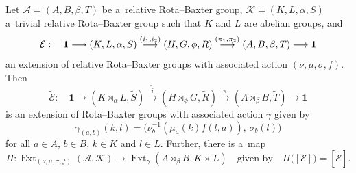\documentclass{jonasart}
\theoremstyle{plain}
\DeclareMathOperator{\Ext}{Ext}
\begin{document}
	\begin{corollary}\label{RRB2rbext}
		Let $\mathcal{A}= (A,B, \beta, T)$ be a~relative Rota--Baxter group, $\mathcal{K}= (K,L,\alpha,S )$ a~trivial relative Rota--Baxter group such that $K$ and $L$ are abelian groups, and
		\[
		\mathcal{E} : \quad {\bf 1} \longrightarrow (K,L,\alpha,S ) \stackrel{(i_1, i_2)}{\longrightarrow}  (H,G, \phi, R) \stackrel{(\pi_1, \pi_2)}{\longrightarrow} (A,B, \beta, T) \longrightarrow {\bf 1}
		\]
		an extension of relative Rota--Baxter groups with associated action $(\nu, \mu, \sigma, f)$. Then
		\begin{equation*}
			\widetilde{\mathcal{E}}: \quad \textbf{1} \longrightarrow (K\rtimes_{\alpha}L, \widetilde{S}) \stackrel{\widetilde{i}}{\longrightarrow} (H\rtimes_{\phi} G, \widetilde{R}) \stackrel{\widetilde{\pi}}{\longrightarrow} (A\rtimes_{\beta} B, \widetilde{T}) \longrightarrow \textbf{1}
		\end{equation*}
		is an extension of Rota--Baxter groups with associated action $\gamma$ given by
		\begin{equation}\label{gamma action rb}
			\gamma_{(a,b)}(k,l)=\big(\nu^{-1}_b (\mu_a (k)f(l,a)),\, \sigma_b (l) \big)
		\end{equation}
		for all $a\in A$, $b\in B$, $k\in K$ and $l\in L$. Further, there is a~map
		\[
		\Pi: \Ext_{(\nu, \mu, \sigma, f)}(\mathcal{A}, \mathcal{K}) \to \Ext_{\gamma}(A\rtimes_\beta B, K\times L)
		\quad \text{given by} \quad
		\Pi\big([\mathcal{E}] \big)= [\widetilde{\mathcal{E}}].
		\]
	\end{corollary}
	
\end{document}
